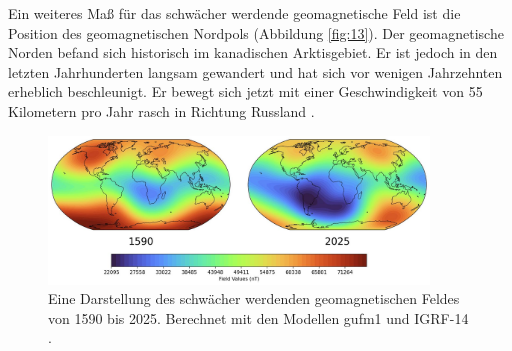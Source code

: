 \documentclass[10pt,twocolumn,letterpaper]{article}
\begin{document}
Ein weiteres Maß für das schwächer werdende geomagnetische Feld ist die Position des geomagnetischen Nordpols (Abbildung \ref{fig:13}). Der geomagnetische Norden befand sich historisch im kanadischen Arktisgebiet. Er ist jedoch in den letzten Jahrhunderten langsam gewandert und hat sich vor wenigen Jahrzehnten erheblich beschleunigt. Er bewegt sich jetzt mit einer Geschwindigkeit von 55 Kilometern pro Jahr rasch in Richtung Russland \cite{124}.

\begin{figure}[t]
\begin{center}
\includegraphics[width=0.9\textwidth]{saa.jpg}
\end{center}
   \caption{Eine Darstellung des schwächer werdenden geomagnetischen Feldes von 1590 bis 2025. Berechnet mit den Modellen gufm1 und IGRF-14 \cite{125,126}.}
\label{fig:14}
\end{figure}
\end{document}
